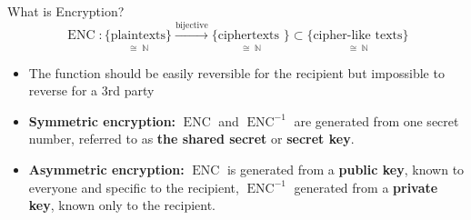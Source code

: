 \documentclass{beamer}
\begin{document}
	\begin{frame}{What is Encryption?} %
		\begin{equation}
			\operatorname{ENC}: \underset{\cong\;\mathbb{N}}{\{\text{plaintexts}\}}
						\overset{\text{bijective}}{\longrightarrow}
						\underset{\cong\;\mathbb{N}}{\{\text{ciphertexts
						}\}} \subset
						\underset{\cong\;\mathbb{N}}{\{\text{cipher-like
						texts}\}} \nonumber
		\end{equation}
		\begin{itemize}
			\item The function should be easily reversible for the
			recipient but impossible to reverse for a 3rd party

 			\item \textbf{Symmetric encryption:} $\operatorname{ENC}$
 			and $\operatorname{ENC}^{-1}$ are generated from one secret
 			number, referred to as \textbf{the shared secret} or
 			\textbf{secret key}.

 			\item \textbf{Asymmetric encryption:} $\operatorname{ENC}$
 			is generated from a \textbf{public key}, known to everyone
 			and specific to the recipient, $\operatorname{ENC}^{-1}$
 			generated from a \textbf{private key}, known only to the
 			recipient.

		\end{itemize}
	\end{frame}
\end{document}
